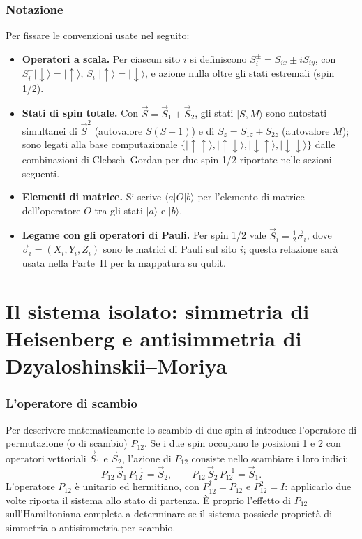 \documentclass[11pt,a4paper]{article}
\begin{document}
\section{Notazione}

Per fissare le convenzioni usate nel seguito:
\begin{itemize}
\item \textbf{Operatori a scala.} Per ciascun sito $i$ si definiscono $S_i^\pm =
S_{ix}\pm iS_{iy}$, con $S_i^+|\!\downarrow\rangle=|\!\uparrow\rangle$,
$S_i^-|\!\uparrow\rangle=|\!\downarrow\rangle$, e azione nulla oltre gli stati
estremali (spin 1/2).
\item \textbf{Stati di spin totale.} Con $\vec S=\vec S_1+\vec S_2$, gli stati
$|S,M\rangle$ sono autostati simultanei di $\vec S^2$ (autovalore $S(S+1)$) e di
$S_z=S_{1z}+S_{2z}$ (autovalore $M$); sono legati alla base computazionale
$\{|\!\uparrow\uparrow\rangle,|\!\uparrow\downarrow\rangle,|\!\downarrow\uparrow\rangle,|\!\downarrow\downarrow\rangle\}$
dalle combinazioni di Clebsch--Gordan per due spin 1/2 riportate nelle sezioni
seguenti.
\item \textbf{Elementi di matrice.} Si scrive $\langle a|O|b\rangle$ per l'elemento di
matrice dell'operatore $O$ tra gli stati $|a\rangle$ e $|b\rangle$.
\item \textbf{Legame con gli operatori di Pauli.} Per spin 1/2 vale $\vec S_i =
\tfrac12\vec\sigma_i$, dove $\vec\sigma_i=(X_i,Y_i,Z_i)$ sono le matrici di Pauli sul
sito $i$; questa relazione sar\`a usata nella Parte~II per la mappatura su qubit.
\end{itemize}

\part{Il sistema isolato: simmetria di Heisenberg e antisimmetria di Dzyaloshinskii--Moriya}

\section{L'operatore di scambio}

Per descrivere matematicamente lo scambio di due spin si introduce l'operatore di
permutazione (o di scambio) $P_{12}$. Se i due spin occupano le posizioni 1 e 2 con
operatori vettoriali $\vec S_1$ e $\vec S_2$, l'azione di $P_{12}$ consiste nello
scambiare i loro indici:
$$P_{12}\,\vec S_1\,P_{12}^{-1}=\vec S_2, \qquad P_{12}\,\vec S_2\,P_{12}^{-1}=\vec S_1.$$
L'operatore $P_{12}$ \`e unitario ed hermitiano, con $P_{12}^\dagger=P_{12}$ e
$P_{12}^2=I$: applicarlo due volte riporta il sistema allo stato di partenza. \`E
proprio l'effetto di $P_{12}$ sull'Hamiltoniana completa a determinare se il sistema
possiede propriet\`a di simmetria o antisimmetria per scambio.
\end{document}
